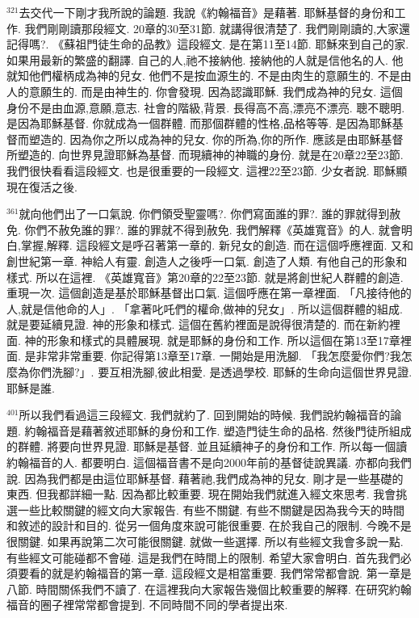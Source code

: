 \documentclass{book}
\begin{document}
$^{321}$去交代一下剛才我所說的論題.
我說《約翰福音》是藉著.
耶穌基督的身份和工作.
我們剛剛讀那段經文.
20章的30至31節.
就講得很清楚了.
我們剛剛讀的,大家還記得嗎?.
《蘇祖門徒生命的品教》這段經文.
是在第11至14節.
耶穌來到自己的家.
如果用最新的繁盛的翻譯.
自己的人,祂不接納他.
接納他的人就是信他名的人.
他就知他們權柄成為神的兒女.
他們不是按血源生的.
不是由肉生的意願生的.
不是由人的意願生的.
而是由神生的.
你會發現.
因為認識耶穌.
我們成為神的兒女.
這個身份不是由血源,意願,意志.
社會的階級,背景.
長得高不高,漂亮不漂亮.
聰不聰明.
是因為耶穌基督.
你就成為一個群體.
而那個群體的性格,品格等等.
是因為耶穌基督而塑造的.
因為你之所以成為神的兒女.
你的所為,你的所作.
應該是由耶穌基督所塑造的.
向世界見證耶穌為基督.
而現續神的神職的身份.
就是在20章22至23節.
我們很快看看這段經文.
也是很重要的一段經文.
這裡22至23節.
少女者說.
耶穌顯現在復活之後.

$^{361}$就向他們出了一口氣說.
你們領受聖靈嗎?.
你們寫面誰的罪?.
誰的罪就得到赦免.
你們不赦免誰的罪?.
誰的罪就不得到赦免.
我們解釋《英雄寬音》的人.
就會明白,掌握,解釋.
這段經文是呼召著第一章的.
新兒女的創造.
而在這個呼應裡面.
又和創世紀第一章.
神給人有靈.
創造人之後呼一口氣.
創造了人類.
有他自己的形象和樣式.
所以在這裡.
《英雄寬音》第20章的22至23節.
就是將創世紀人群體的創造.
重現一次.
這個創造是基於耶穌基督出口氣.
這個呼應在第一章裡面.
「凡接待他的人,就是信他命的人」.
「拿著叱吒們的權命,做神的兒女」.
所以這個群體的組成.
就是要延續見證.
神的形象和樣式.
這個在舊約裡面是說得很清楚的.
而在新約裡面.
神的形象和樣式的具體展現.
就是耶穌的身份和工作.
所以這個在第13至17章裡面.
是非常非常重要.
你記得第13章至17章.
一開始是用洗腳.
「我怎麼愛你們?我怎麼為你們洗腳?」.
要互相洗腳,彼此相愛.
是透過學校.
耶穌的生命向這個世界見證.
耶穌是誰.

$^{401}$所以我們看過這三段經文.
我們就約了.
回到開始的時候.
我們說約翰福音的論題.
約翰福音是藉著敘述耶穌的身份和工作.
塑造門徒生命的品格.
然後門徒所組成的群體.
將要向世界見證.
耶穌是基督.
並且延續神子的身份和工作.
所以每一個讀約翰福音的人.
都要明白.
這個福音書不是向2000年前的基督徒說異議.
亦都向我們說.
因為我們都是由這位耶穌基督.
藉著祂,我們成為神的兒女.
剛才是一些基礎的東西.
但我都詳細一點.
因為都比較重要.
現在開始我們就進入經文來思考.
我會挑選一些比較關鍵的經文向大家報告.
有些不關鍵.
有些不關鍵是因為我今天的時間和敘述的設計和目的.
從另一個角度來說可能很重要.
在於我自己的限制.
今晚不是很關鍵.
如果再說第二次可能很關鍵.
就做一些選擇.
所以有些經文我會多說一點.
有些經文可能碰都不會碰.
這是我們在時間上的限制.
希望大家會明白.
首先我們必須要看的就是約翰福音的第一章.
這段經文是相當重要.
我們常常都會說.
第一章是八節.
時間關係我們不讀了.
在這裡我向大家報告幾個比較重要的解釋.
在研究約翰福音的圈子裡常常都會提到.
不同時間不同的學者提出來.
\end{document}
